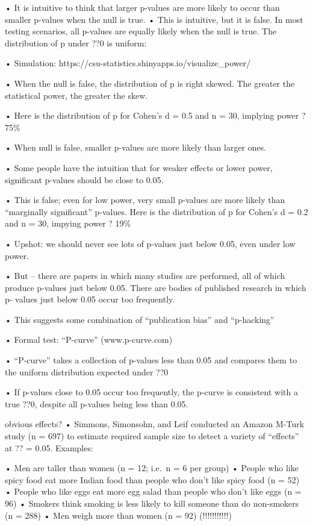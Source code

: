 \documentclass[
  letterpaper,
  DIV=11,
  numbers=noendperiod]{scrreprt}
\begin{document}
• It is intuitive to think that larger p-values are more likely to occur
than smaller p-values when the null is true. • This is intuitive, but it
is false. In most testing scenarios, all p-values are equally likely
when the null is true. The distribution of p under ??0 is uniform:

• Simulation: https://csu-statistics.shinyapps.io/visualize\_power/

• When the null is false, the distribution of p is right skewed. The
greater the statistical power, the greater the skew.

• Here is the distribution of p for Cohen's d = 0.5 and n = 30, implying
power ? 75\%

• When null is false, smaller p-values are more likely than larger ones.

• Some people have the intuition that for weaker effects or lower power,
significant p-values should be close to 0.05.

• This is false; even for low power, very small p-values are more likely
than ``marginally significant'' p-values. Here is the distribution of p
for Cohen's d = 0.2 and n = 30, impying power ? 19\%

• Upshot: we should never see lots of p-values just below 0.05, even
under low power.

• But -- there are papers in which many studies are performed, all of
which produce p-values just below 0.05. There are bodies of published
research in which p- values just below 0.05 occur too frequently.

• This suggests some combination of ``publication bias'' and
``p-hacking''

• Formal test: ``P-curve'' (www.p-curve.com)

• ``P-curve'' takes a collection of p-values less than 0.05 and compares
them to the uniform distribution expected under ??0

• If p-values close to 0.05 occur too frequently, the p-curve is
consistent with a true ??0, despite all p-values being less than 0.05.

obvious effects? • Simmons, Simonsohn, and Leif conducted an Amazon
M-Turk study (n = 697) to estimate required sample size to detect a
variety of ``effects'' at ?? = 0.05. Examples:

• Men are taller than women (n = 12; i.e.~n = 6 per group) • People who
like spicy food eat more Indian food than people who don't like spicy
food (n = 52) • People who like eggs eat more egg salad than people who
don't like eggs (n = 96) • Smokers think smoking is less likely to kill
someone than do non-smokers (n = 288) • Men weigh more than women (n =
92) (!!!!!!!!!!!)
\end{document}
